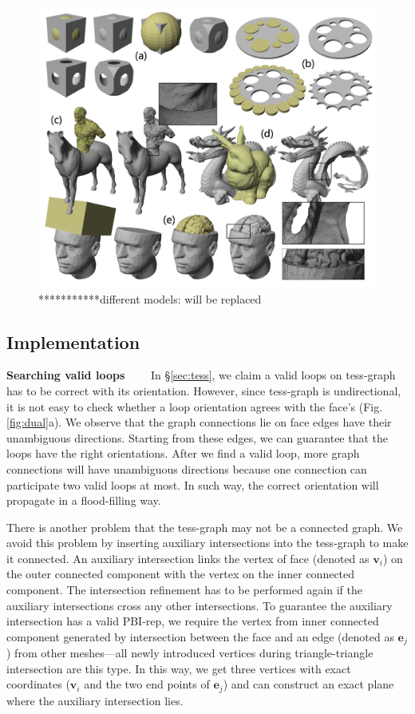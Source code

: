 \documentclass[10pt,journal,compsoc]{IEEEtran}
\begin{document}
\begin{figure}[!t]
\centering
\includegraphics[width=7in]{models}
\caption{***********different models: will be replaced}
\label{fig:models}
\end{figure}

\subsection{Implementation}
\label{sec:esubroutine}


\vspace{0.5em}
\noindent\textbf{Searching valid loops}~~~~ In \S\ref{sec:tess}, we claim a valid loops on tess-graph has to be correct with its orientation. However, since tess-graph is undirectional, it is not easy to check whether a loop orientation agrees with the face's (Fig. \ref{fig:dual}a). We observe that the graph connections lie on face edges have their unambiguous directions. Starting from these edges, we can guarantee that the loops have the right orientations. After we find a valid loop, more graph connections will have unambiguous directions because one connection can participate two valid loops at most. In such way, the correct orientation will propagate in a flood-filling way.



\vspace{0.5em} There is another problem that the tess-graph may not be a connected graph. We avoid this problem by inserting auxiliary intersections into the tess-graph to make it connected. An auxiliary intersection links the vertex of face (denoted as $\bm{v}_i$) on the outer connected component with the vertex on the inner connected component. The intersection refinement has to be performed again if the auxiliary intersections cross any other intersections. To guarantee the auxiliary intersection has a valid PBI-rep, we require the vertex from inner connected component generated by intersection between the face and an edge (denoted as $\bm{e}_j$) from other meshes---all newly introduced vertices during triangle-triangle intersection are this type. In this way, we get three vertices with exact coordinates ($\bm{v}_i$ and the two end points of $\bm{e}_j$) and can construct an exact plane where the auxiliary intersection lies.
\end{document}
